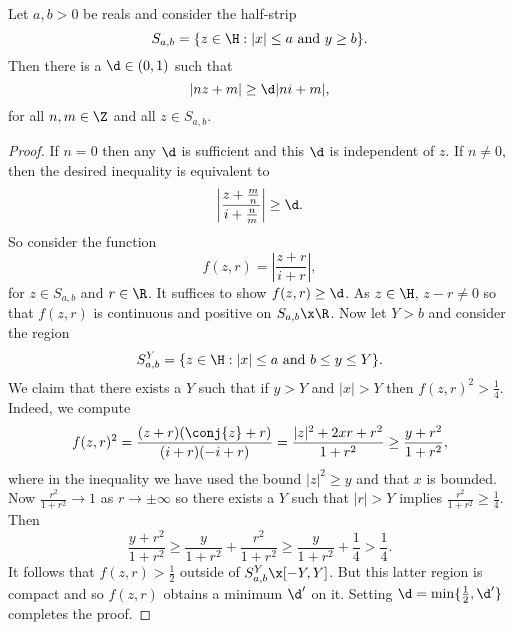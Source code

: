     \begin{lemma}\label{lem:technical_Eisenstein_convergence_lemma}
      Let $a,b > 0$ be reals and consider the half-strip
      \[
        S_{a,b} = \{z \in \H:\text{$|x| \le a$ and $y \ge b$}\}.
      \]
      Then there is a $\d \in (0,1)$ such that
      \[
        |nz+m| \ge \d|ni+m|,
      \]
      for all $n,m \in \Z$ and all $z \in S_{a,b}$.
    \end{lemma}
    \begin{proof}
      If $n = 0$ then any $\d$ is sufficient and this $\d$ is independent of $z$. If $n \neq 0$, then the desired inequality is equivalent to
      \[
        \left|\frac{z+\frac{m}{n}}{i+\frac{n}{m}}\right| \ge \d.
      \]
      So consider the function
      \[
        f(z,r) = \left|\frac{z+r}{i+r}\right|,
      \]
      for $z \in S_{a,b}$ and $r \in \R$. It suffices to show $f(z,r) \ge \d$. As $z \in \H$, $z-r \neq 0$ so that $f(z,r)$ is continuous and positive on $S_{a,b} \x \R$. Now let $Y > b$ and consider the region
      \[
        S_{a,b}^{Y} = \{z \in \H:\text{$|x| \le a$ and $b \le y \le Y$}\}.
      \]
      We claim that there exists a $Y$ such that if $y > Y$ and $|x| > Y$ then $f(z,r)^{2} > \frac{1}{4}$. Indeed, we compute
      \[
        f(z,r)^{2} = \frac{(z+r)(\conj{z}+r)}{(i+r)(-i+r)} = \frac{|z|^{2}+2xr+r^{2}}{1+r^{2}} \ge \frac{y+r^{2}}{1+r^{2}},
      \]
      where in the inequality we have used the bound $|z|^{2} \ge y$ and that $x$ is bounded. Now $\frac{r^{2}}{1+r^{2}} \to 1$ as $r \to \pm\infty$ so there exists a $Y$ such that $|r| > Y$ implies $\frac{r^{2}}{1+r^{2}} \ge \frac{1}{4}$. Then
      \[
        \frac{y+r^{2}}{1+r^{2}} \ge \frac{y}{1+r^{2}}+\frac{r^{2}}{1+r^{2}} \ge \frac{y}{1+r^{2}}+\frac{1}{4} > \frac{1}{4}.
      \]
      It follows that $f(z,r) > \frac{1}{2}$ outside of $S_{a,b}^{Y} \x [-Y,Y]$. But this latter region is compact and so $f(z,r)$ obtains a minimum $\d'$ on it. Setting $\d = \min\{\frac{1}{2},\d'\}$ completes the proof.
    \end{proof}

